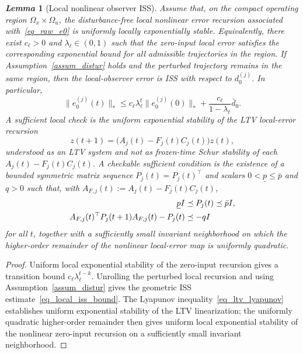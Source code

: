 \documentclass[letterpaper,journal]{IEEEtran}
\newtheorem{lemma}{\it Lemma}%
\begin{document}
\begin{lemma}[Local nonlinear observer ISS]\label{lem_local_iss}
Assume that, on the compact operating region $\Omega_x\times\Omega_u$, the disturbance-free local nonlinear error recursion associated with~\eqref{eq_raw_e0} is uniformly locally exponentially stable. Equivalently, there exist $c_{\ell}>0$ and $\lambda_{\ell}\in(0,1)$ such that the zero-input local error satisfies the corresponding exponential bound for all admissible trajectories in the region. If Assumption~\ref{assum_distur} holds and the perturbed trajectory remains in the same region, then the local-observer error is ISS with respect to $d_0^{(j)}$. In particular,
\begin{equation}
\|e_0^{(j)}(t)\|_*
\le c_{\ell}\lambda_{\ell}^{t}\|e_0^{(j)}(0)\|_*
+\frac{c_{\ell}}{1-\lambda_{\ell}}\bar d_0 .
\label{eq_local_iss_bound}
\end{equation}
A sufficient local check is the uniform exponential stability of the LTV local-error recursion
\begin{equation}
z(t+1)=\big(A_j(t)-F_j(t)C_j(t)\big)z(t),
\label{eq_ltv_local_error}
\end{equation}
understood as an LTV system and not as frozen-time Schur stability of each $A_j(t)-F_j(t)C_j(t)$. A checkable sufficient condition is the existence of a bounded symmetric matrix sequence $P_j(t)=P_j(t)^\top$ and scalars $0<\underline p\le\bar p$ and $q>0$ such that, with $A_{F,j}(t):=A_j(t)-F_j(t)C_j(t)$,
\begin{align}
\underline p I&\preceq P_j(t)\preceq\bar p I,\notag\\
A_{F,j}(t)^\top P_j(t+1)A_{F,j}(t)-P_j(t)
&\preceq-qI
\label{eq_ltv_lyapunov}
\end{align}
for all $t$, together with a sufficiently small invariant neighborhood on which the higher-order remainder of the nonlinear local-error map is uniformly quadratic.
\end{lemma}
\begin{proof}
Uniform local exponential stability of the zero-input recursion gives a transition bound $c_{\ell}\lambda_{\ell}^{t-k}$. Unrolling the perturbed local recursion and using Assumption~\ref{assum_distur} gives the geometric ISS estimate~\eqref{eq_local_iss_bound}. The Lyapunov inequality~\eqref{eq_ltv_lyapunov} establishes uniform exponential stability of the LTV linearization; the uniformly quadratic higher-order remainder then gives uniform local exponential stability of the nonlinear zero-input recursion on a sufficiently small invariant neighborhood.
\end{proof}
\end{document}
